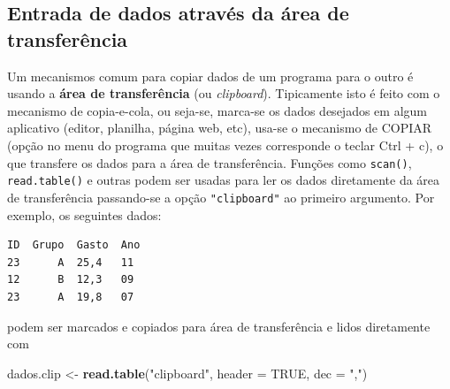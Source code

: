 \documentclass[10pt,a4paper]{book}
\newenvironment{Shaded}{\begin{snugshade}}{\end{snugshade}}
\newcommand{\KeywordTok}[1]{\textcolor[rgb]{0.13,0.29,0.53}{\textbf{#1}}}
\newcommand{\DataTypeTok}[1]{\textcolor[rgb]{0.13,0.29,0.53}{#1}}
\newcommand{\DecValTok}[1]{\textcolor[rgb]{0.00,0.00,0.81}{#1}}
\newcommand{\FloatTok}[1]{\textcolor[rgb]{0.00,0.00,0.81}{#1}}
\newcommand{\StringTok}[1]{\textcolor[rgb]{0.31,0.60,0.02}{#1}}
\newcommand{\OtherTok}[1]{\textcolor[rgb]{0.56,0.35,0.01}{#1}}
\newcommand{\OperatorTok}[1]{\textcolor[rgb]{0.81,0.36,0.00}{\textbf{#1}}}
\newcommand{\ErrorTok}[1]{\textcolor[rgb]{0.64,0.00,0.00}{\textbf{#1}}}
\newcommand{\NormalTok}[1]{#1}
\begin{document}
\subsection{Entrada de dados através da área de
transferência}\label{entrada-de-dados-atravuxe9s-da-uxe1rea-de-transferuxeancia}

Um mecanismos comum para copiar dados de um programa para o outro é
usando a \textbf{área de transferência} (ou \emph{clipboard}).
Tipicamente isto é feito com o mecanismo de copia-e-cola, ou seja-se,
marca-se os dados desejados em algum aplicativo (editor, planilha,
página web, etc), usa-se o mecanismo de COPIAR (opção no menu do
programa que muitas vezes corresponde o teclar Ctrl + c), o que
transfere os dados para a área de transferência. Funções como
\texttt{scan()}, \texttt{read.table()} e outras podem ser usadas para
ler os dados diretamente da área de transferência passando-se a opção
\texttt{"clipboard"} ao primeiro argumento. Por exemplo, os seguintes
dados:

\begin{verbatim}
ID  Grupo  Gasto  Ano
23      A  25,4   11
12      B  12,3   09
23      A  19,8   07
\end{verbatim}

podem ser marcados e copiados para área de transferência e lidos
diretamente com

\begin{Shaded}
\begin{Highlighting}[]
\NormalTok{dados.clip <-}\StringTok{ }\KeywordTok{read.table}\NormalTok{(}\StringTok{"clipboard"}\NormalTok{, }\DataTypeTok{header =} \OtherTok{TRUE}\NormalTok{, }\DataTypeTok{dec =} \StringTok{","}\NormalTok{)}
\end{Highlighting}
\end{Shaded}

\begin{Shaded}
\end{Shaded}
\end{document}

